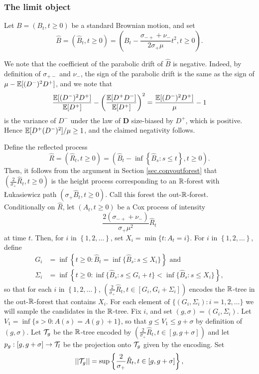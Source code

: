 \subsubsection{The limit object}\label{subsubsec.samplecontinuousobject}
Let $B = (B_t,t\geq 0)$ be a standard Brownian motion, and set $$\hat{B} = \left(\hat{B}_t,t\geq 0\right)=\left(B_t-\frac{\sigma_{-+}+\nu_-}{2\sigma_+\mu}t^2,t\geq 0\right).$$ 
\begin{remark}
We note that the coefficient of the parabolic drift of $\hat{B}$ is negative. Indeed, by definition of $\sigma_{+-}$ and $\nu_-$, the sign of the parabolic drift is the same as the sign of $\mu-{\mathbb E}[(D^-)^2D^+]$, and we note that
$$\frac{{\mathbb E}[(D^-)^2D^+]}{{\mathbb E}[D^+]}-\left(\frac{{\mathbb E}[D^+D^-]}{{\mathbb E}[D^+]}\right)^2=\frac{{\mathbb E}[(D^-)^2D^+]}{\mu}-1$$
is the variance of $D^-$ under the law of $\mathbf{D}$ size-biased by $D^+$, which is positive. Hence ${\mathbb E}[D^+(D^-)^2]/\mu\geq 1$, and the claimed negativity follows. 

\end{remark}
Define the reflected process
$$\hat{R} = (\hat{R}_t,t\geq 0)= \left(\hat{B}_t-\inf\left\{\hat{B}_s: s\leq t\right\},t\geq 0\right).$$
Then, it follows from the argument in Section \ref{sec.convoutforest} that $\left(\frac{2}{\sigma_+}\hat{R}_t,t\geq 0\right)$ is the height process corresponding to an ${\mathbb R}$-forest with \L ukasiewicz path $\left(\sigma_+\hat{B}_t,t\geq 0\right)$. Call this forest the out-${\mathbb R}$-forest. \\
Conditionally on $\hat{R}$, let $(A_t,t\geq 0)$ be a Cox process of intensity $$\frac{2(\sigma_{-+}+\nu_-)}{\sigma_+\mu^2} \hat{R}_t$$ at time $t$. Then, for $i$ in $\left\{1,2, \dots \right\}$, set $X_i=\min\{t:A_t=i\}$. For $i$ in $\left\{1,2,\dots \right\}$, define
\begin{align*}
G_i&=\inf\left\{t\geq 0:\hat{B}_t=\inf\{\hat{B}_s:s\leq X_i\}\right\}\text{ and}\\
\Sigma_i&=\inf\left\{ t\geq 0: \inf\{\hat{B}_s:s\leq G_i+t\} < \inf\{\hat{B}_s:s\leq X_i\}\right\},
\end{align*}
so that for each $i$ in $\left\{1,2,\dots \right\}$, $\left(\frac{2}{\sigma_+}\hat{R}_t,t\in [G_i,G_i+\Sigma_i]\right)$ encodes the ${\mathbb R}$-tree in the out-${\mathbb R}$-forest that contains $X_i$. For each element of $\{(G_i,\Sigma_i):i=1,2,\dots\}$ we will sample the candidates in the ${\mathbb R}$-tree. Fix $i$, and set $(g,\sigma)=(G_i,\Sigma_i)$. Let $V_1=\inf\{s>0:A(s)=A(g)+1\}$, so that $g\leq V_1\leq g+\sigma$ by definition of $(g,\sigma)$. Let ${\mathcal T}_g$ be the ${\mathbb R}$-tree encoded by $\left(\frac{2}{\sigma_+}\hat{R}_t,t\in [g,g+\sigma]\right)$ and let $p_g:[g,g+\sigma]\to {\mathcal T}_l$ be the projection onto ${\mathcal T}_g$ given by the encoding. Set $$||{\mathcal T}_g||=\sup\left\{\frac{2}{\sigma_+}\hat{R}_t,t\in [g,g+\sigma]\right\},$$
